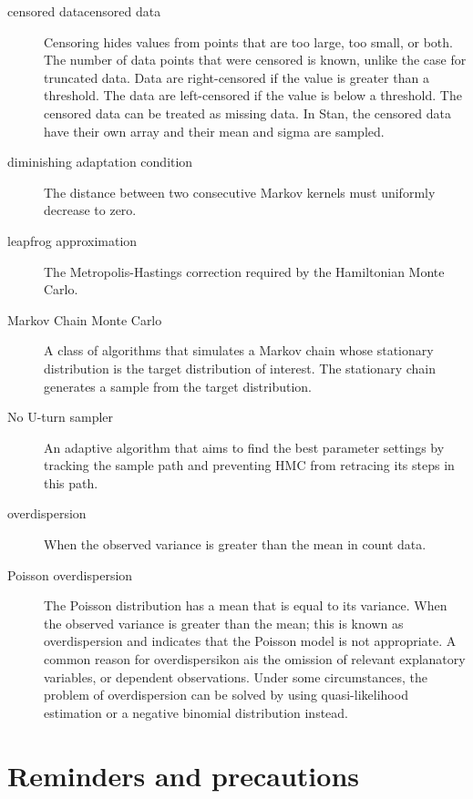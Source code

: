 \documentclass[10pt,letterpaper]{article}
\begin{document}
\begin{description}
  \item [censored datacensored data] Censoring hides values from points that are too large, too small, or both. The number of data points that were censored is known, unlike the case for truncated data. Data are right-censored if the value is greater than a threshold. The data are left-censored if the value is below a threshold. The censored data can be treated as missing data. In Stan, the censored data have their own array and their mean and sigma are sampled.
  \item [diminishing adaptation condition] The distance between two consecutive Markov kernels must uniformly decrease to zero.
  \item [leapfrog approximation] The Metropolis-Hastings correction required by the Hamiltonian Monte Carlo.
  \item [Markov Chain Monte Carlo] A class of algorithms that simulates a Markov chain whose stationary distribution is the target distribution of interest. The stationary chain generates a sample from the target distribution.
  \item [No U-turn sampler] An adaptive algorithm that aims to find the best parameter settings by tracking the sample path and preventing HMC from retracing its steps in this path.
  \item [overdispersion] When the observed variance is greater than the mean in count data.
  \item [Poisson overdispersion] The Poisson distribution has a mean that is equal to its variance. When the observed variance is greater than the mean; this is known as overdispersion and indicates that the Poisson model is not appropriate. A common reason for overdispersikon ais the omission of relevant explanatory variables, or dependent observations. Under some circumstances, the problem of overdispersion can be solved by using quasi-likelihood estimation or a negative binomial distribution instead.
\end{description}



\section{Reminders and precautions}




\printindex
\end{document}
